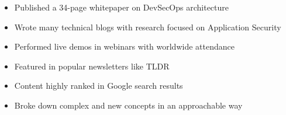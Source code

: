 \documentclass[../../../main.tex]{subfiles}
\begin{document}
\begin{itemize}
    \item Published a 34-page whitepaper on DevSecOps architecture
    \item Wrote many technical blogs with research focused on Application Security
    \item Performed live demos in webinars with worldwide attendance
    \item Featured in popular newsletters like TLDR
    \item Content highly ranked in Google search results
    \item Broke down complex and new concepts in an approachable way
\end{itemize}
\end{document}
